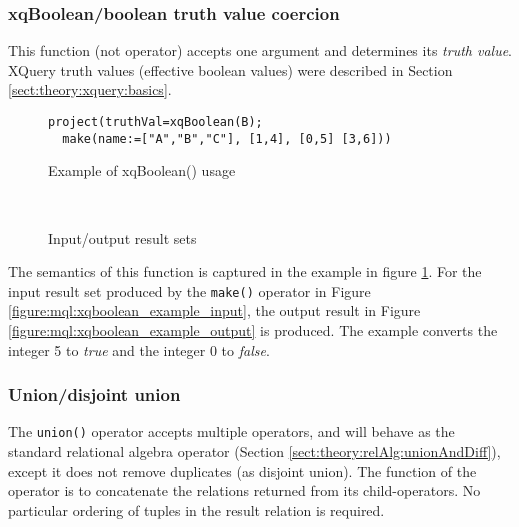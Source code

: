 \subsubsection{xqBoolean/boolean truth value coercion}

This function (not operator) accepts one argument and determines its \textit{truth value}. XQuery truth values
(effective boolean values) were described in Section \ref{sect:theory:xquery:basics}.

\begin{figure}[!h]
\centering
\begin{Verbatim}
project(truthVal=xqBoolean(B); 
  make(name:=["A","B","C"], [1,4], [0,5] [3,6]))
\end{Verbatim}
\caption{Example of xqBoolean() usage}
\label{figure:mql:xqboolean_example}
\end{figure}

\begin{figure}[!h]
\centering
\mbox{
\quad
{}
}
\caption{Input/output result sets}
\end{figure}

The semantics of this function is captured in the example in figure
\ref{figure:mql:xqboolean_example}. For the input result set produced by the
\texttt{make()} operator in Figure \ref{figure:mql:xqboolean_example_input},
the output result in Figure \ref{figure:mql:xqboolean_example_output} is
produced. The example converts the integer 5 to \textit{true} and the integer 0
to \textit{false}. 

\subsubsection{Union/disjoint union}
The \texttt{union()} operator accepts multiple operators, and will behave as the standard relational algebra
operator (Section \ref{sect:theory:relAlg:unionAndDiff}), except it does not remove duplicates (as disjoint
union). The function of the operator is to concatenate the relations returned from its child-operators. No
particular ordering of tuples in the result relation is required.
